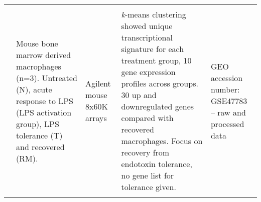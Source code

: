 \begin{center}
\begin{landscape}
\begin{center}
\begin{longtable}[ht]{p{.15\textheight} p{.40\textheight} p{.20\textheight} p{.60\textheight} p{.10\textheight}}
& & & & \\

\textcite{OCarroll2014} & Mouse bone marrow derived macrophages (n=3). Untreated (N), acute response to LPS (LPS activation group), LPS tolerance (T) and recovered (RM). & Agilent mouse 8x60K arrays & \emph{k}-means clustering showed unique transcriptional signature for each treatment group, 10 gene expression profiles across groups. 30 up and downregulated genes compared with recovered macrophages. Focus on recovery from endotoxin tolerance, no gene list for tolerance given. & GEO accession number: GSE47783 – raw and processed data \\

\bottomrule
\medskip
\end{longtable}
\end{center}
\end{landscape}

\clearpage

\end{center}